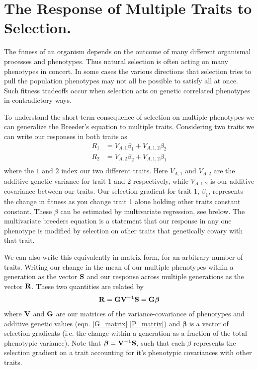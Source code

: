 
\chapter{The Response of Multiple Traits to Selection.}
The fitness of an organism depends on the outcome of many different
organismal processes and phenotypes. Thus natural selection is often acting on many
phenotypes in concert. In some cases the various directions that selection
tries to pull the population phenotypes may not all be possible to
satisfy all at once. Such fitness tradeoffs occur when selection acts on genetic correlated phenotypes in 
contradictory ways. 

To understand the short-term consequence of selection on multiple
phenotypes we can generalize the Breeder's equation  to multiple traits\cite{lande:79}. Considering two traits we can write our responses in both traits as
\begin{eqnarray}
R_1 & = V_{A,1} \beta_1 + V_{A,1,2} \beta_2 \nonumber \\
R_2 & = V_{A,2} \beta_2 + V_{A,1,2} \beta_1  \nonumber \\
\end{eqnarray}
where the $1$ and $2$ index our two different traits. Here $V_{A,1} $
and $ V_{A,2}$ are the additive genetic variance for trait $1$ and $2$
respectively, while $V_{A,1,2}$ is our additive covariance between our
traits. Our selection gradient for trait 1, $\beta_1$, represents the
change in fitness as you change trait 1 alone holding other traits
constant constant. These $\beta$ can be estimated by multivariate
regression, see brelow. 
The multivariate breeders equation is a statement that our response in
any one phenotype is modified by selection on other traits that
genetically covary with that trait. 

We can also write this equivalently in matrix form, for an arbitrary
number of traits. Writing our change in the mean of our multiple phenotypes within a generation as the vector $\bf{S}$ and our response across multiple generations as
the vector $\bf{R}$. These two quantities are related by 
\begin{equation}
\bf{R} = \bf{G} \bf{V}^{-1} \bf{S} = \bf{G} \boldsymbol{ \beta}
\end{equation}
 where $\bf{V}$ and $\bf{G}$ are our matrices of the
 variance-covariance of phenotypes and additive genetic values
 (eqn. \eqref{G_matrix} \eqref{P_matrix}) and
 $\boldsymbol{\beta}$ is a vector of selection gradients (i.e. the
 change within a generation as a fraction of the total phenotypic
 variance). Note that $\boldsymbol{\beta} = \bf{V}^{-1} \bf{S} $, such
 that each $\beta$ represents the selection gradient on a trait
 accounting for it's phenotypic covariances with other traits. 

